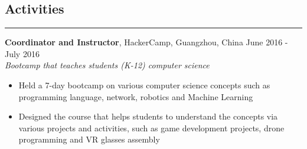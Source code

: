 \documentclass[line]{res} %
\begin{document}
\begin{resume}

  \section{Activities}
  \rule{\textwidth}{1pt}
    \textbf{Coordinator and Instructor}, HackerCamp, Guangzhou, China
    \hfill June 2016 - July 2016 \\
    \textit{Bootcamp that teaches students (K-12) computer science}
    \begin{itemize} \itemsep -2pt  %
      \item Held a 7-day bootcamp on various computer science concepts such as programming language, network, robotics and Machine Learning
      \item Designed the course that helps students to understand the concepts via various projects and activities, such as game development projects, drone programming and VR glasses assembly
    \end{itemize}



\end{resume}
\end{document}
